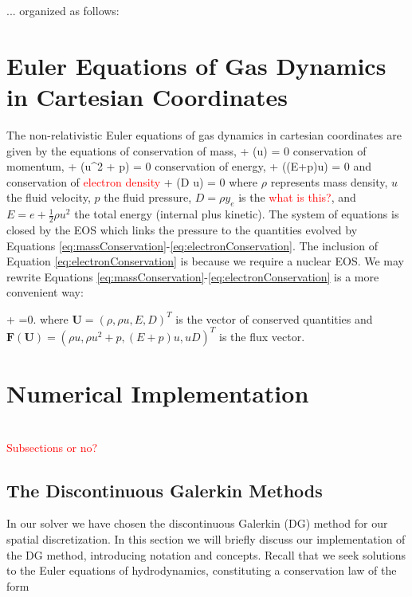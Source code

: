 \documentclass[twocolumn]{aastex62}
\begin{document}

... organized as follows:

\section{Euler Equations of Gas Dynamics in Cartesian Coordinates}
The non-relativistic Euler equations of gas dynamics
\citep[see, e.g.,][for details]{leveque:2002} in cartesian coordinates are given by
the equations of conservation of mass,
\beq
   + (\rho u) = 0
  \label{eq:massConservation}
\eeq
conservation of momentum,
\beq
	 + (\rho u^2 + p) = 0
  \label{eq:momentumConservation}
\eeq
conservation of energy,
\beq
   + ((E+p)u) = 0
  \label{eq:energyConservation}
\eeq
and conservation of \textcolor{red}{electron density}
\beq
   + (D u) = 0
  \label{eq:electronConservation}
\eeq
where $\rho$ represents mass density, $u$ the fluid velocity, $p$ the fluid
pressure, $D=\rho y_e$ is the \textcolor{red}{what is this?},
and $E=e+\frac{1}{2}\rho u^2$ the total energy (internal plus kinetic).
The system of equations is closed by the EOS which links the pressure to
the quantities evolved by Equations
\eqref{eq:massConservation}-\eqref{eq:electronConservation}. The inclusion of
Equation \eqref{eq:electronConservation} is because we require a nuclear EOS.
We may rewrite Equations \eqref{eq:massConservation}-\eqref{eq:electronConservation}
is a more convenient way:

\beq
  +
  =0.
\eeq
where $\mathbf{U} =(\rho,\rho u,E, D)^{T}$ is the vector of conserved quantities
and $\mathbf{F}(\mathbf{U})=(\rho u,\rho u^{2}+p,(E+p)u, uD)^{T}$
is the flux vector.

\section{Numerical Implementation}
\label{DG}

 \\
\textcolor{red}{Subsections or no?}

\subsection{The Discontinuous Galerkin Methods}
In our solver we have chosen the discontinuous Galerkin (DG) method
for our spatial discretization. In this section we will briefly discuss our
implementation of the DG method, introducing notation and concepts. Recall that
we seek solutions to the Euler equations of hydrodynamics, constituting a
conservation law of the form
\end{document}
